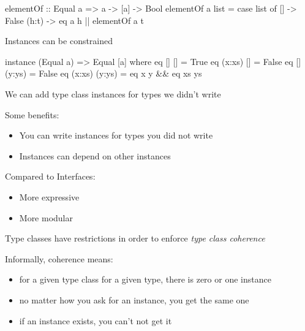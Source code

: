\documentclass[usenames,dvipsnames,svgnames,table,aspectratio=169,mathserif]{beamer}
\newcommand{\nl}{\vspace{\baselineskip}}
\newcommand{\pnl}{\pause \nl}
\begin{document}
\begin{frame}[fragile]
\begin{haskellcode}
elementOf :: Equal a => a -> [a] -> Bool
elementOf a list =
  case list of
    []    -> False
    (h:t) -> eq a h || elementOf a t
\end{haskellcode}
\end{frame}


\begin{frame}[fragile]
Instances can be constrained

\nl

\begin{haskellcode}
instance (Equal a) => Equal [a] where
  eq []     []     = True
  eq (x:xs) []     = False
  eq []     (y:ys) = False
  eq (x:xs) (y:ys) = eq x y && eq xs ys
\end{haskellcode}

\pnl

We can add type class instances for types we didn't write
\end{frame}


\begin{frame}

Some benefits:
\begin{itemize}
\item You can write instances for types you did not write
\item Instances can depend on other instances
\end{itemize}

\nl

Compared to Interfaces:
\begin{itemize}
\item More expressive
\item More modular
\end{itemize}

\end{frame}


\begin{frame}
Type classes have restrictions in order to enforce {\it type class coherence}

\nl

Informally, coherence means:
\begin{itemize}
\item for a given type class for a given type, there is zero or one instance 
\item no matter how you ask for an instance, you get the same one
\item if an instance exists, you can't not get it
\end{itemize}
\end{frame}
\end{document}

